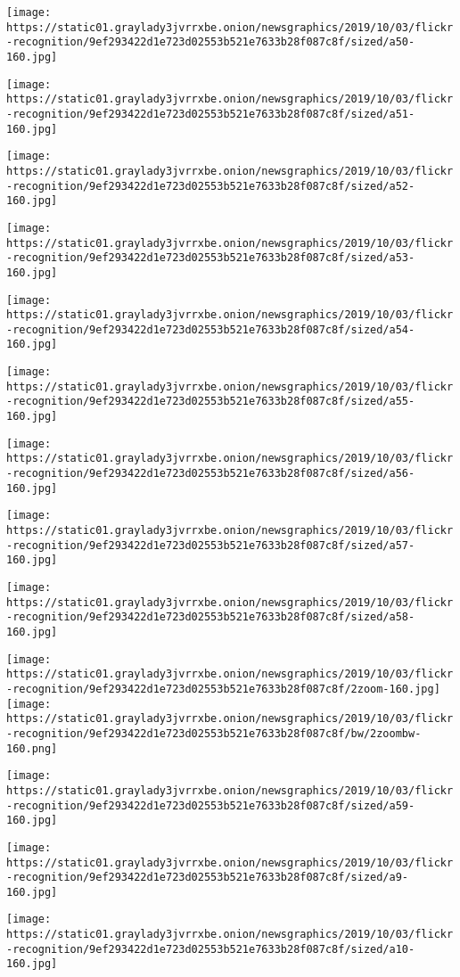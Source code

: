 \texttt{[image: https://static01.graylady3jvrrxbe.onion/newsgraphics/2019/10/03/flickr-recognition/9ef293422d1e723d02553b521e7633b28f087c8f/sized/a50-160.jpg]}

\texttt{[image: https://static01.graylady3jvrrxbe.onion/newsgraphics/2019/10/03/flickr-recognition/9ef293422d1e723d02553b521e7633b28f087c8f/sized/a51-160.jpg]}

\texttt{[image: https://static01.graylady3jvrrxbe.onion/newsgraphics/2019/10/03/flickr-recognition/9ef293422d1e723d02553b521e7633b28f087c8f/sized/a52-160.jpg]}

\texttt{[image: https://static01.graylady3jvrrxbe.onion/newsgraphics/2019/10/03/flickr-recognition/9ef293422d1e723d02553b521e7633b28f087c8f/sized/a53-160.jpg]}

\texttt{[image: https://static01.graylady3jvrrxbe.onion/newsgraphics/2019/10/03/flickr-recognition/9ef293422d1e723d02553b521e7633b28f087c8f/sized/a54-160.jpg]}

\texttt{[image: https://static01.graylady3jvrrxbe.onion/newsgraphics/2019/10/03/flickr-recognition/9ef293422d1e723d02553b521e7633b28f087c8f/sized/a55-160.jpg]}

\texttt{[image: https://static01.graylady3jvrrxbe.onion/newsgraphics/2019/10/03/flickr-recognition/9ef293422d1e723d02553b521e7633b28f087c8f/sized/a56-160.jpg]}

\texttt{[image: https://static01.graylady3jvrrxbe.onion/newsgraphics/2019/10/03/flickr-recognition/9ef293422d1e723d02553b521e7633b28f087c8f/sized/a57-160.jpg]}

\texttt{[image: https://static01.graylady3jvrrxbe.onion/newsgraphics/2019/10/03/flickr-recognition/9ef293422d1e723d02553b521e7633b28f087c8f/sized/a58-160.jpg]}

\texttt{[image: https://static01.graylady3jvrrxbe.onion/newsgraphics/2019/10/03/flickr-recognition/9ef293422d1e723d02553b521e7633b28f087c8f/2zoom-160.jpg]}\texttt{[image: https://static01.graylady3jvrrxbe.onion/newsgraphics/2019/10/03/flickr-recognition/9ef293422d1e723d02553b521e7633b28f087c8f/bw/2zoombw-160.png]}

\texttt{[image: https://static01.graylady3jvrrxbe.onion/newsgraphics/2019/10/03/flickr-recognition/9ef293422d1e723d02553b521e7633b28f087c8f/sized/a59-160.jpg]}

\texttt{[image: https://static01.graylady3jvrrxbe.onion/newsgraphics/2019/10/03/flickr-recognition/9ef293422d1e723d02553b521e7633b28f087c8f/sized/a9-160.jpg]}

\texttt{[image: https://static01.graylady3jvrrxbe.onion/newsgraphics/2019/10/03/flickr-recognition/9ef293422d1e723d02553b521e7633b28f087c8f/sized/a10-160.jpg]}

